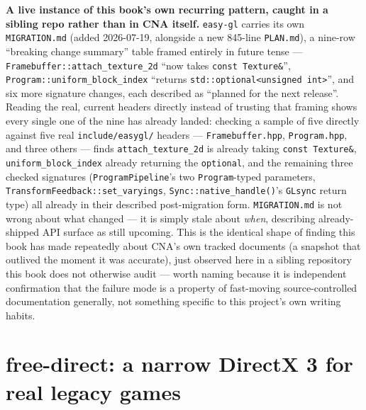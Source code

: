 \begin{sourcenote}
\textbf{A live instance of this book's own recurring pattern, caught in a sibling repo rather
than in CNA itself.} \texttt{easy-gl} carries its own \texttt{MIGRATION.md} (added 2026-07-19,
alongside a new 845-line \texttt{PLAN.md}), a nine-row ``breaking change summary'' table framed
entirely in future tense --- \texttt{Framebuffer::attach\_texture\_2d} ``now takes
\texttt{const~Texture\&}'', \texttt{Program::uniform\_block\_index} ``returns
\texttt{std::optional<unsigned~int>}'', and six more signature changes, each described as
``planned for the next release''. Reading the real, current headers directly instead of
trusting that framing shows every single one of the nine has already landed: checking a sample
of five directly against five real \texttt{include/easygl/} headers ---
\texttt{Framebuffer.hpp}, \texttt{Program.hpp}, and three others --- finds
\texttt{attach\_texture\_2d} is already taking
\texttt{const~Texture\&}, \texttt{uniform\_block\_index} already returning the
\texttt{optional}, and the remaining three checked signatures (\texttt{ProgramPipeline}'s two
\texttt{Program}-typed parameters, \texttt{TransformFeedback::set\_varyings},
\texttt{Sync::native\_handle()}'s \texttt{GLsync} return type) all already in their described
post-migration form. \texttt{MIGRATION.md} is not wrong about what changed --- it is simply
stale about \emph{when}, describing already-shipped API surface as still upcoming. This is the
identical shape of finding this book has made repeatedly about CNA's own tracked documents
(a snapshot that outlived the moment it was accurate), just observed here in a sibling
repository this book does not otherwise audit --- worth naming because it is independent
confirmation that the failure mode is a property of fast-moving source-controlled documentation
generally, not something specific to this project's own writing habits.
\end{sourcenote}

\section{free-direct: a narrow DirectX 3 for real legacy games}

